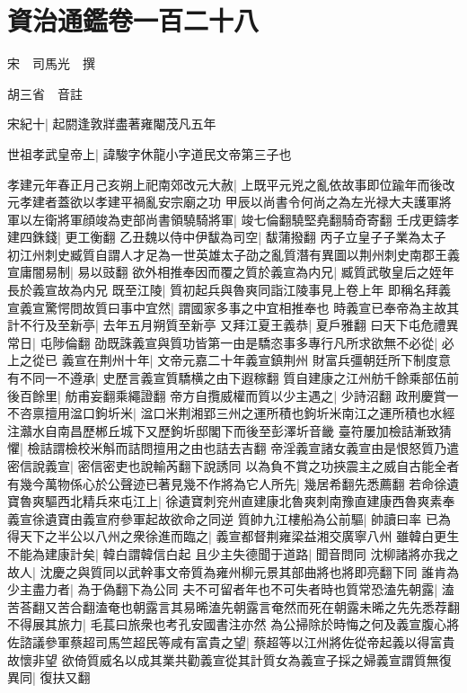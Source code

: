 \chapter{資治通鑑卷一百二十八}
宋　司馬光　撰

胡三省　音註

宋紀十|{
	起閼逢敦牂盡著雍閹茂凡五年}


世祖孝武皇帝上|{
	諱駿字休龍小字道民文帝第三子也}


孝建元年春正月己亥朔上祀南郊改元大赦|{
	上既平元兇之亂依故事即位踰年而後改元孝建者蓋欲以孝建平禍亂安宗廟之功}
甲辰以尚書令何尚之為左光禄大夫護軍將軍以左衛將軍顔竣為吏部尚書領驍騎將軍|{
	竣七倫翻驍堅堯翻騎奇寄翻}
壬戌更鑄孝建四銖錢|{
	更工衡翻}
乙丑魏以侍中伊馛為司空|{
	馛蒲撥翻}
丙子立皇子子業為太子　初江州刺史臧質自謂人才足為一世英雄太子劭之亂質潛有異圖以荆州刺史南郡王義宣庸闇易制|{
	易以豉翻}
欲外相推奉因而覆之質於義宣為内兄|{
	臧質武敬皇后之姪年長於義宣故為内兄}
既至江陵|{
	質初起兵與魯爽同詣江陵事見上卷上年}
即稱名拜義宣義宣驚愕問故質曰事中宜然|{
	謂國家多事之中宜相推奉也}
時義宣已奉帝為主故其計不行及至新亭|{
	去年五月朔質至新亭}
又拜江夏王義恭|{
	夏戶雅翻}
曰天下屯危禮異常日|{
	屯陟倫翻}
劭既誅義宣與質功皆第一由是驕恣事多專行凡所求欲無不必從|{
	必上之從已}
義宣在荆州十年|{
	文帝元嘉二十年義宣鎮荆州}
財富兵彊朝廷所下制度意有不同一不遵承|{
	史歷言義宣質驕横之由下遐稼翻}
質自建康之江州舫千餘乘部伍前後百餘里|{
	舫甫妄翻乘繩證翻}
帝方自攬威權而質以少主遇之|{
	少詩沼翻}
政刑慶賞一不咨禀擅用湓口鉤圻米|{
	湓口米荆湘郢三州之運所積也鉤圻米南江之運所積也水經注灨水自南昌歷郴丘城下又歷鉤圻邸閣下而後至彭澤圻音畿}
臺符屢加檢詰漸致猜懼|{
	檢詰謂檢校米斛而詰問擅用之由也詰去吉翻}
帝淫義宣諸女義宣由是恨怒質乃遣密信說義宣|{
	密信密吏也說輸芮翻下說誘同}
以為負不賞之功挾震主之威自古能全者有幾今萬物係心於公聲迹已著見幾不作將為它人所先|{
	幾居希翻先悉薦翻}
若命徐遺寶魯爽驅西北精兵來屯江上|{
	徐遺寶刺兖州直建康北魯爽刺南豫直建康西魯爽素奉義宣徐遺寶由義宣府參軍起故欲命之同逆}
質帥九江樓船為公前驅|{
	帥讀曰率}
已為得天下之半公以八州之衆徐進而臨之|{
	義宣都督荆雍梁益湘交廣寧八州}
雖韓白更生不能為建康計矣|{
	韓白謂韓信白起}
且少主失德聞于道路|{
	聞音問同}
沈柳諸將亦我之故人|{
	沈慶之與質同以武幹事文帝質為雍州柳元景其部曲將也將即亮翻下同}
誰肯為少主盡力者|{
	為于偽翻下為公同}
夫不可留者年也不可失者時也質常恐溘先朝露|{
	溘苦荅翻又苦合翻溘奄也朝露言其易晞溘先朝露言奄然而死在朝露未晞之先先悉荐翻}
不得展其旅力|{
	毛萇曰旅衆也考孔安國書注亦然}
為公掃除於時悔之何及義宣腹心將佐諮議參軍蔡超司馬竺超民等咸有富貴之望|{
	蔡超等以江州將佐從帝起義以得富貴故懷非望}
欲倚質威名以成其業共勸義宣從其計質女為義宣子採之婦義宣謂質無復異同|{
	復扶又翻}
